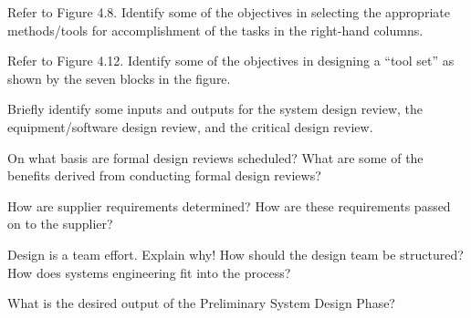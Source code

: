 \begin{exercises}
    \begin{exercise}
    \label{sea-4-20}
        Refer to Figure 4.8. Identify some of the objectives in selecting the appropriate methods/tools for accomplishment of the tasks in the right-hand columns.
    \end{exercise}
    \begin{solution}
    \end{solution}
    
    \begin{exercise}
    \label{sea-4-21}
        Refer to Figure 4.12. Identify some of the objectives in designing a “tool set” as shown by the seven blocks in the figure.
    \end{exercise}
    \begin{solution}
    \end{solution}
    
    \begin{exercise}
    \label{sea-4-22}
        Briefly identify some inputs and outputs for the system design review, the equipment/software design review, and the critical design review.
    \end{exercise}
    \begin{solution}
    \end{solution}
    
    \begin{exercise}
    \label{sea-4-23}
        On what basis are formal design reviews scheduled? What are some of the benefits derived from conducting formal design reviews?
    \end{exercise}
    \begin{solution}
    \end{solution}
    
    \begin{exercise}
    \label{sea-4-24}
        How are supplier requirements determined? How are these requirements passed on to the supplier?
    \end{exercise}
    \begin{solution}
    \end{solution}
    
    \begin{exercise}
    \label{sea-4-25}
        Design is a team effort. Explain why! How should the design team be structured? How does systems engineering fit into the process?
    \end{exercise}
    \begin{solution}
    \end{solution}
    
    \begin{exercise}
    \label{sea-4-26}
        What is the desired output of the Preliminary System Design Phase?
    \end{exercise}
    \begin{solution}
    \end{solution}
\end{exercises}
